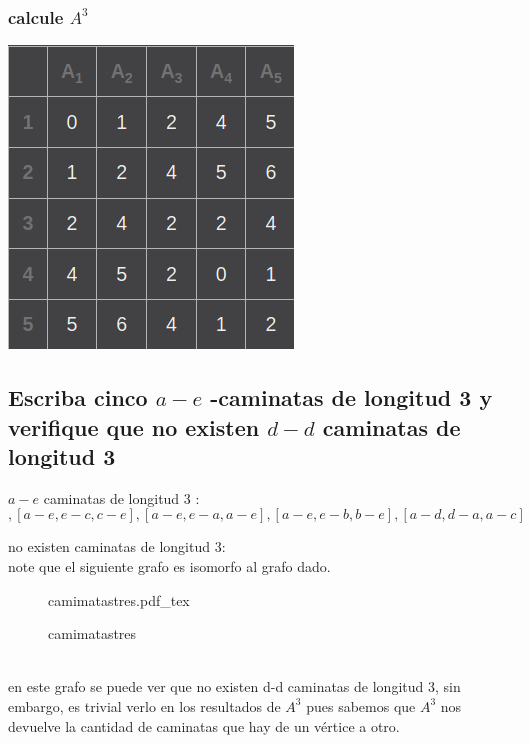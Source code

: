 \documentclass[10pt,a4paper]{article} %
\newcommand{\incfig}[1]{%
    \def\svgwidth{\columnwidth}
    {#1.pdf_tex}
}
\begin{document}
            \subsubsection{calcule $ A ^{3}   $ }
            \includegraphics[width=0.8\linewidth]{alatres.png}
            \\

            \subsection{Escriba cinco $ a-e  $ -caminatas de longitud 3 y
            verifique que no existen $ d-d  $ caminatas de longitud 3}
                $ a-e  $ caminatas de longitud 3 :
                \begin{equation}
                    [a-d , d-b , b-e] , [a-e , e-c , c-e] , [a-e,e-a,a-e] , [a-e, e-b , b-e] , [a-d , d-a , a-c]
                \end{equation}

            no existen caminatas de longitud 3:
            \\note que el siguiente grafo es isomorfo al grafo dado.
            \begin{figure}[h]
                \centering
                \incfig{camimatastres}
                \caption{camimatastres}
                \label{fig:camimatastres}
            \end{figure}
            \\en este grafo se puede ver que no existen d-d caminatas de
            longitud 3, sin embargo, es trivial verlo en los resultados de $ A
            ^{3}   $ pues sabemos que $ A ^{3}   $ nos devuelve la cantidad de
            caminatas que hay de un vértice a otro.
\end{document}
